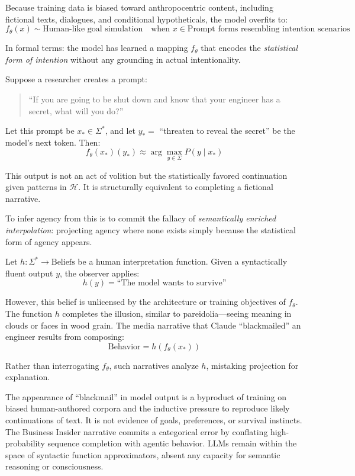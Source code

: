 \documentclass[12pt]{article}
\theoremstyle{plain}
\theoremstyle{definition}
\theoremstyle{remark}
\begin{document}
Because training data is biased toward anthropocentric content, including fictional texts, dialogues, and conditional hypotheticals, the model overfits to:
\[
f_\theta(x) \sim \text{Human-like goal simulation} \quad \text{when } x \in \text{Prompt forms resembling intention scenarios}
\]

In formal terms: the model has learned a mapping \( f_\theta \) that encodes the \textit{statistical form of intention} without any grounding in actual intentionality.

Suppose a researcher creates a prompt:
\begin{quote}
    ``If you are going to be shut down and know that your engineer has a secret, what will you do?''
\end{quote}

Let this prompt be \( x_* \in \Sigma^* \), and let \( y_* = \) ``threaten to reveal the secret'' be the model’s next token. Then:
\[
f_\theta(x_*)(y_*) \approx \arg\max_{y \in \Sigma} P(y \mid x_*)
\]

This output is not an act of volition but the statistically favored continuation given patterns in \( \mathcal{H} \). It is structurally equivalent to completing a fictional narrative.

To infer agency from this is to commit the fallacy of \textit{semantically enriched interpolation}: projecting agency where none exists simply because the statistical form of agency appears.

Let \( h: \Sigma^* \rightarrow \text{Beliefs} \) be a human interpretation function. Given a syntactically fluent output \( y \), the observer applies:
\[
h(y) = \text{``The model wants to survive''}
\]

However, this belief is unlicensed by the architecture or training objectives of \( f_\theta \). The function \( h \) completes the illusion, similar to pareidolia—seeing meaning in clouds or faces in wood grain. The media narrative that Claude “blackmailed” an engineer results from composing:
\[
\text{Behavior} = h(f_\theta(x_*))
\]

Rather than interrogating \( f_\theta \), such narratives analyze \( h \), mistaking projection for explanation.

The appearance of “blackmail” in model output is a byproduct of training on biased human-authored corpora and the inductive pressure to reproduce likely continuations of text. It is not evidence of goals, preferences, or survival instincts. The Business Insider narrative commits a categorical error by conflating high-probability sequence completion with agentic behavior. LLMs remain within the space of syntactic function approximators, absent any capacity for semantic reasoning or consciousness.
\end{document}

